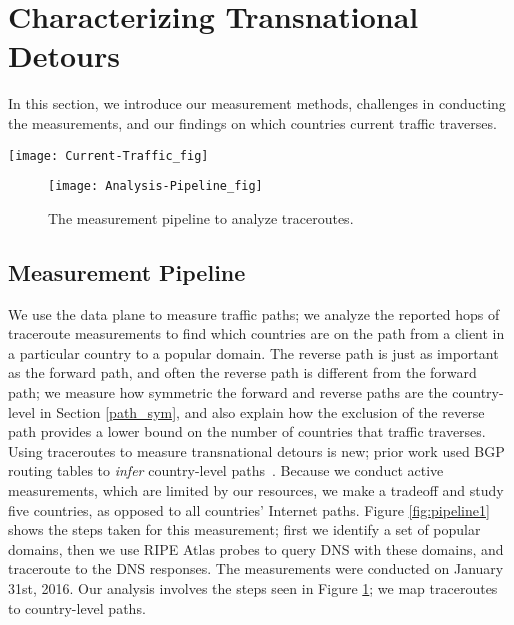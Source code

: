 \section{Characterizing Transnational Detours}
\label{datasets}
In this section, we introduce our measurement methods, challenges in conducting the measurements, and our findings on which countries current traffic traverses.

\begin{figure*}[t]
\centering
\texttt{[image: Current-Traffic\_fig]}
\caption{The measurement pipeline to study current traffic routes.}
\label{fig:pipeline1}
\end{figure*}

\begin{figure}[t]
\centering
\texttt{[image: Analysis-Pipeline\_fig]}
\caption{The measurement pipeline to analyze traceroutes.}
\label{fig:analysis_pipeline}
\end{figure}

\subsection{Measurement Pipeline}
\label{pipeline}
We use the data plane to measure traffic paths; we analyze the reported hops of traceroute measurements to find which countries are on the path from a client in a particular country to a popular domain.  The reverse path is just as important as the forward path, and often the reverse path is different from the forward path; we measure how symmetric the forward and reverse paths are the country-level in Section \ref{path_sym}, and also explain how the exclusion of the reverse path provides a lower bound on the number of countries that traffic traverses.  Using traceroutes to measure transnational detours is new; prior work used BGP routing tables to \textit{infer} country-level paths~\cite{karlin2009nation}.  Because we conduct active measurements, which are limited by our resources, we make a tradeoff and study five countries, as opposed to all countries' Internet paths.  Figure \ref{fig:pipeline1} shows the steps taken for this measurement; first we identify a set of popular domains, then we use RIPE Atlas probes to query DNS with these domains, and traceroute to the DNS responses.  The measurements were conducted on January 31st, 2016.  Our analysis involves the steps seen in Figure \ref{fig:analysis_pipeline}; we map traceroutes to country-level paths.

